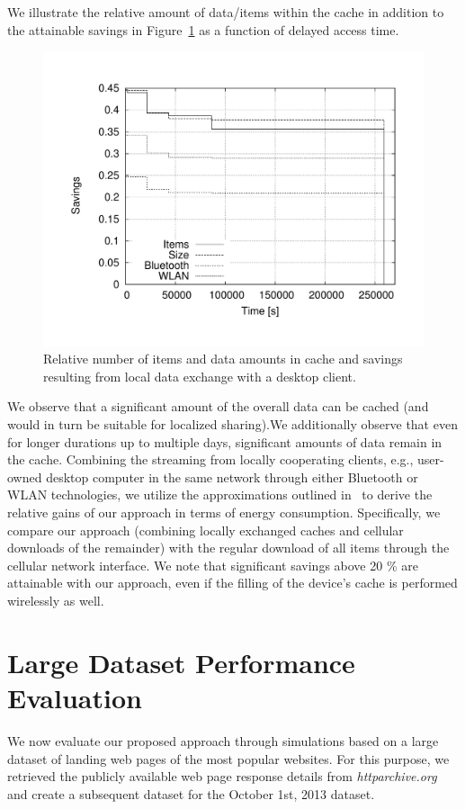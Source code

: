 \documentclass[letterpaper,conference]{IEEEtran}
\begin{document}
We illustrate the relative amount of data/items within the cache in addition to the attainable savings in Figure~\ref{fig:rel_ios_time} as a function of delayed access time. 
\begin{figure}
	\centering
	\includegraphics[width=.95\linewidth]{rel_ios_time}
	\caption{Relative number of items and data amounts in cache and savings resulting from local data exchange with a desktop client.}
	\label{fig:rel_ios_time}
\end{figure}
We observe that a significant amount of the overall data can be cached (and would in turn be suitable for localized sharing).We additionally observe that even for longer durations up to multiple days, significant amounts of data remain in the cache.
Combining the streaming from locally cooperating clients, e.g., user-owned desktop computer in the same network through either Bluetooth or WLAN technologies, we utilize the approximations outlined in~\cite{} to derive the relative gains of our approach in terms of energy consumption. 
Specifically, we compare our approach (combining locally exchanged caches and cellular downloads of the remainder) with the regular download of all items through the cellular network interface. 
We note that significant savings above 20 \% are attainable with our approach, even if the filling of the device's cache is performed wirelessly as well.



\section{Large Dataset Performance Evaluation}
\label{s:large}
We now evaluate our proposed approach through simulations based on a large dataset of landing web pages of the most popular websites.
For this purpose, we retrieved the publicly available web page response details from \emph{httparchive.org} and create a subsequent dataset for the October 1st, 2013 dataset.
\end{document}
